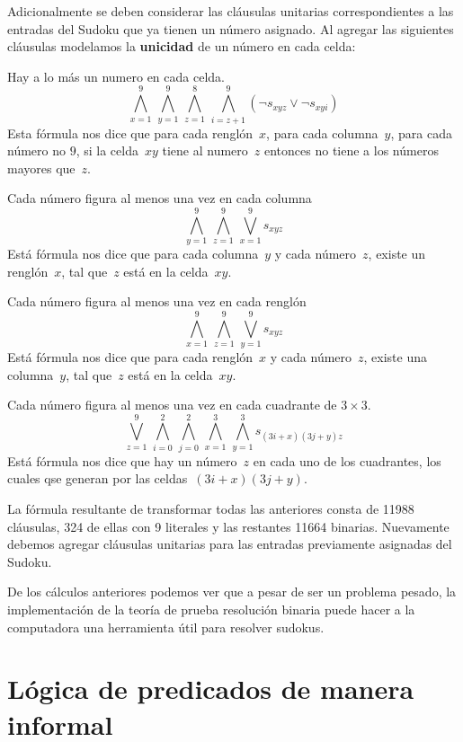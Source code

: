 \documentclass[11pt,letterpaper]{article}
\begin{document}
Adicionalmente se deben considerar las cláusulas unitarias 
correspondientes a las entradas del Sudoku que ya tienen un número asignado.
Al agregar las siguientes cláusulas modelamos la \textbf{unicidad} de un número 
en cada celda:
\bi
\item Hay a lo más un numero en cada celda.
\[
\bigwedge_{x=1}^9\,\bigwedge_{y=1}^9\,\bigwedge_{z=1}^8\,\bigwedge_{i=z+1}^9 
(\neg s_{xyz} \lor \neg s_{xyi})
\]
Esta fórmula nos dice que para cada renglón~$x$, para cada columna~$y$, para 
cada número no $9$, si la celda~$xy$ tiene al numero~$z$ entonces no tiene a 
los números mayores que~$z$.

\item Cada número figura al menos una vez en cada columna
$$ \bigwedge_{y=1}^9\,\bigwedge_{z=1}^9\,\bigvee_{x=1}^9 s_{xyz} $$
Está fórmula nos dice que para cada columna~$y$ y cada número~$z$, existe un 
renglón~$x$, tal que~$z$ está en la celda~$xy$.

\item Cada número figura al menos una vez en cada renglón
$$ \bigwedge_{x=1}^9\,\bigwedge_{z=1}^9\,\bigvee_{y=1}^9 s_{xyz} $$
Está fórmula nos dice que para cada renglón~$x$ y cada número~$z$, existe una 
columna~$y$, tal que~$z$ está en la celda~$xy$.

\item Cada número figura al menos una vez en cada cuadrante de $3\times 3$.
\[
\bigvee_{z=1}^9\,\bigwedge_{i=0}^2\,\bigwedge_{j=0}^2\,\bigwedge_{x=1}^3\, 
\bigwedge_ { y=1 }^3 s_{(3i+x)(3j+y)z}
\]
Está fórmula nos dice que hay un número~$z$ en cada uno de los cuadrantes, los 
cuales qse generan por las celdas~$(3i+x)(3j+y)$.
\ei

La fórmula resultante de transformar todas las anteriores consta de 11988 
cláusulas, 324 de ellas con 9 literales y las restantes 
11664 binarias. Nuevamente debemos agregar cláusulas unitarias para las 
entradas 
previamente asignadas del Sudoku.

\espc

De los c\'alculos anteriores podemos ver que a pesar de ser un problema 
pesado, la implementaci\'on de la teor\'ia de prueba resoluci\'on binaria puede 
hacer a la computadora una herramienta \'util para resolver sudokus.



\section{Lógica de predicados de manera informal}
\end{document}
